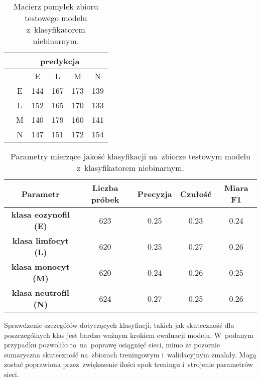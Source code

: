 {\begin{itemize}
\begin{table}[h!]
\centering
\caption[Short Heading]{Macierz pomyłek zbioru testowego modelu z~klasyfikatorem niebinarnym.}
\label{tab:kaggle_1_conf_matrix_2}
\begin{tabular}{|c|c|c|c|c|c|}
\hline
\textbf{}                           & \multicolumn{5}{c|}{\textbf{predykcja}} \\ \hline
{\multirow{5}{*}{\rotatebox[origin=c]{90}{\textbf{klasa}}}} &         & E       & L        & M      & N       \\ \cline{2-6} 
                                    & E       & 144       & 167      & 173      & 139      \\ \cline{2-6} 
                                    & L       & 152       & 165      & 170      & 133      \\ \cline{2-6} 
                                    & M       & 140       & 179      & 160      & 141      \\ \cline{2-6} 
                                    & N       & 147       & 151      & 172      & 154       \\ \hline
\end{tabular}
\end{table}

\end{itemize}
}

\begin{table}[h!]
\centering
\caption[Short Heading]{Parametry mierzące jakość klasyfikacji na~zbiorze testowym modelu z~klasyfikatorem niebinarnym.}
\label{tab:kaggle_1_params_val_2}
\begin{tabular}{|c|c|c|c|c|}
\hline
\textbf{Parametr}                              & \textbf{Liczba próbek}  & \textbf{Precyzja} & \textbf{Czułość} & \textbf{Miara F1} \\ \hline
\textbf{klasa eozynofil (E)} & 623 & 0.25   & 0.23   & 0.24  \\ \hline
\textbf{klasa limfocyt (L)} & 620 & 0.25  & 0.27 & 0.26    \\ \hline
\textbf{klasa monocyt (M)} & 620 & 0.24   & 0.26    & 0.25   \\ \hline
\textbf{klasa neutrofil (N)} & 624 & 0.27   & 0.25    & 0.26   \\ \hline
\end{tabular}
\end{table}

Sprawdzenie szczegółów dotyczących klasyfiacji, takich jak skuteczność dla poszczególnych klas jest bardzo ważnym krokiem ewaluacji modelu. W~podanym przypadku pozwoliło to~na~poprawę osiągnięć sieci, mimo że pozornie sumaryczna skuteczność na~zbiorach treningowym i~walidacyjnym zmalały. Mogą zostać poprawiona przez~zwiększenie ilości epok treningu i~strojenie parametrów sieci.

